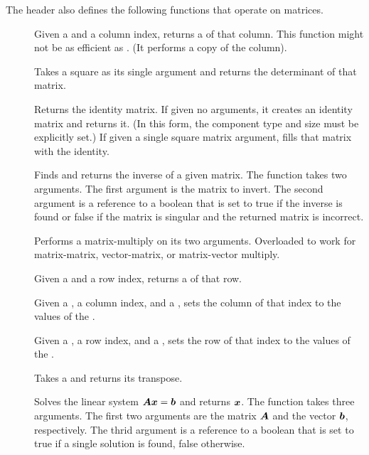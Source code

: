 The  header also defines the following
functions that operate on matrices.

\begin{description}
\item[]  Given a 
  and a column index, returns a  of that column. This function
  might not be as efficient as . (It performs a copy of
  the column).
\item[]  Takes a square
   as its single argument and returns the
  determinant of that matrix.
\item[]  Returns the
  identity matrix. If given no arguments, it creates an identity matrix and
  returns it. (In this form, the component type and size must be explicitly
  set.) If given a single square matrix argument, fills that matrix with
  the identity.
\item[]  Finds and returns the
  inverse of a given matrix. The function takes two arguments. The first
  argument is the matrix to invert. The second argument is a reference to a
  boolean that is set to true if the inverse is found or false if the
  matrix is singular and the returned matrix is incorrect.
\item[] Performs a matrix-multiply on its two
  arguments. Overloaded to work for matrix-matrix, vector-matrix, or
  matrix-vector multiply.
\item[]  Given a  and a
  row index, returns a  of that row.
\item[] Given a , a column
  index, and a , sets the column of that index to the values of
  the .
\item[] Given a , a row index,
  and a , sets the row of that index to the values of the
  .
\item[]  Takes a
   and returns its transpose.
\item[]  Solves the linear
  system $\matrixsym{A}\vectorsym{x} = \vectorsym{b}$ and returns
  $\vectorsym{x}$. The function takes three arguments. The first two
  arguments are the matrix $\matrixsym{A}$ and the vector $\vectorsym{b}$,
  respectively. The thrid argument is a reference to a boolean that is set
  to true if a single solution is found, false otherwise.
\end{description}

